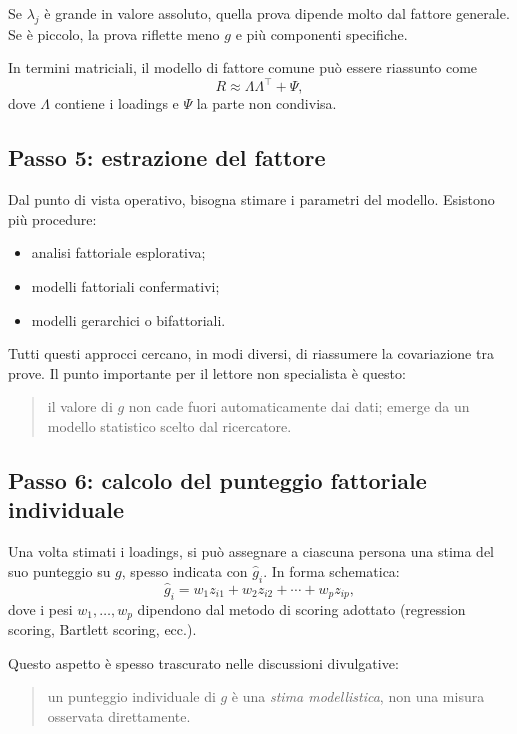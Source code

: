 \documentclass[10pt, a4paper]{article}
\theoremstyle{plain}
\theoremstyle{definition}
\theoremstyle{remark}
\begin{document}
Se $\lambda_j$ è grande in valore assoluto, quella prova dipende molto dal
fattore generale. Se è piccolo, la prova riflette meno $g$ e più componenti
specifiche.

In termini matriciali, il modello di fattore comune può essere riassunto come
\begin{equation}
R \approx \Lambda\Lambda^\top + \Psi,
\label{eq:commonfactor}
\end{equation}
dove $\Lambda$ contiene i loadings e $\Psi$ la parte non condivisa.

\subsection{Passo 5: estrazione del fattore}

Dal punto di vista operativo, bisogna stimare i parametri del modello.
Esistono più procedure:
\begin{itemize}
    \item analisi fattoriale esplorativa;
    \item modelli fattoriali confermativi;
    \item modelli gerarchici o bifattoriali.
\end{itemize}

Tutti questi approcci cercano, in modi diversi, di riassumere la covariazione
tra prove. Il punto importante per il lettore non specialista è questo:

\begin{quote}
il valore di $g$ non cade fuori automaticamente dai dati; emerge da un modello
statistico scelto dal ricercatore.
\end{quote}

\subsection{Passo 6: calcolo del punteggio fattoriale individuale}

Una volta stimati i loadings, si può assegnare a ciascuna persona una stima del
suo punteggio su $g$, spesso indicata con $\hat{g}_i$. In forma schematica:
\begin{equation}
\hat{g}_i = w_1 z_{i1} + w_2 z_{i2} + \cdots + w_p z_{ip},
\label{eq:factorscore}
\end{equation}
dove i pesi $w_1,\ldots,w_p$ dipendono dal metodo di scoring adottato
(regression scoring, Bartlett scoring, ecc.).

Questo aspetto è spesso trascurato nelle discussioni divulgative:
\begin{quote}
un punteggio individuale di $g$ è una \emph{stima modellistica}, non una misura
osservata direttamente.
\end{quote}
\end{document}

